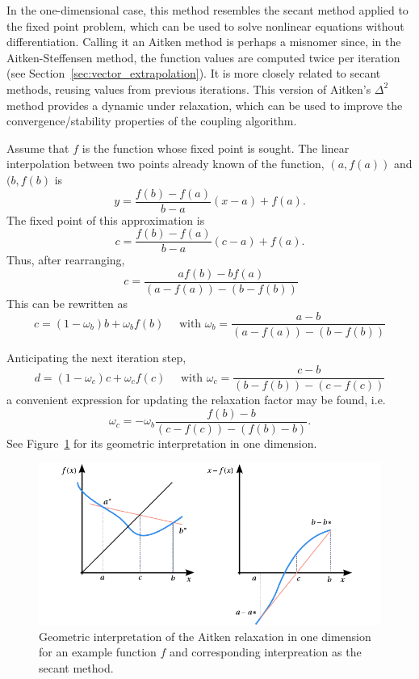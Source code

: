 In the one-dimensional case, this method resembles the secant method applied to the fixed point problem, which can be used to solve nonlinear equations without differentiation.
Calling it an Aitken method is perhaps a misnomer since, in the Aitken-Steffensen method, the function values are computed twice per iteration (see Section~\ref{sec:vector_extrapolation}).
It is more closely related to secant methods, reusing values from previous iterations.
This version of Aitken's \(\Delta^2\) method provides a dynamic under relaxation, which can be used to improve the convergence/stability properties of the coupling algorithm.

Assume that \(f\) is the function whose fixed point is sought.
The linear interpolation between two points already known of the function, \((a, f(a))\) and \((b, f(b)\) is
\begin{equation}
  y = \frac{f(b)-f(a)}{b-a}(x-a) + f(a).
\end{equation}
The fixed point of this approximation is
\begin{equation}
  c = \frac{f(b)-f(a)}{b-a}(c-a) + f(a).
\end{equation}
Thus, after rearranging,
\begin{equation}\
c=\frac{a f(b)- b f(a)}{\left(a-f(a)\right)-\left(b-f(b)\right)}
\end{equation}
This can be rewritten as
\begin{equation}
c=\left(1-\omega_{b}\right) b+\omega_{b} f(b) \quad \text { with } \omega_{b}=\frac{a-b}{\left(a-f(a)\right)-\left(b-f(b)\right)}
\end{equation}

Anticipating the next iteration step,
\begin{equation}
d=\left(1-\omega_{c}\right) c+\omega_{c} f(c) \quad \text { with } \omega_{c}=\frac{c-b}{\left(b-f(b)\right)-\left(c-f(c)\right)}
\end{equation}
a convenient expression for updating the relaxation factor may be found, i.e.
\begin{equation}
\omega_{c}=-\omega_{b}\frac{f(b)-b}{(c-f(c))-(f(b)-b)}.
\end{equation}
See Figure~\ref{fig:mod_aitken} for its geometric interpretation in one dimension.

\begin{figure}[htbp]
  \includegraphics{figures/mod_aitken}
  \caption{Geometric interpretation of the Aitken relaxation in one dimension for an example function \(f\) and corresponding interpreation as the secant method.}
  \label{fig:mod_aitken}
\end{figure}

